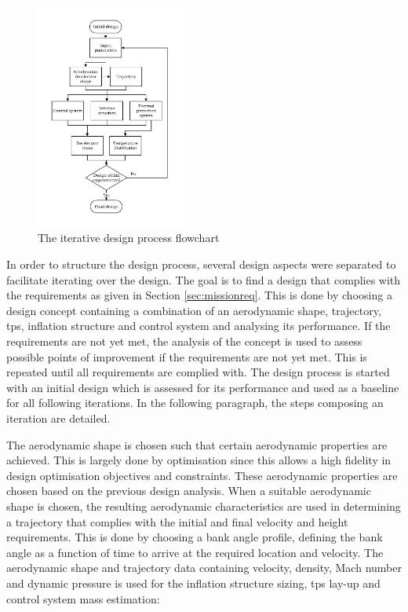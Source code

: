 \begin{figure}
	\includegraphics[width=0.44\textwidth]{./Figure/DesignIterationPhilosophy_new_cropped.pdf}
	\caption{The iterative design process flowchart}
	\label{fig:iterativedesignflowchart}		
\end{figure}


In order to structure the design process, several design aspects were separated to facilitate  iterating over the design. The goal is to find a design that complies with the requirements as given in Section \ref{sec:missionreq}. This is done by choosing a design concept containing a combination of an aerodynamic shape, trajectory, \gls{tps}, inflation structure and control system and analysing its performance. If the requirements are not yet met, the analysis of the concept is used to assess possible points of improvement if the requirements are not yet met. This is repeated until all requirements are complied with. The design process is started with an initial design which is assessed for its performance and used as a baseline for all following iterations. In the following paragraph, the steps composing an iteration are detailed.


The aerodynamic shape is chosen such that certain aerodynamic properties are achieved. This is largely done by optimisation since this allows a high fidelity in design optimisation objectives and constraints. These aerodynamic properties are chosen based on the previous design analysis. 
When a suitable aerodynamic shape is chosen, the resulting aerodynamic characteristics are used in determining a trajectory that complies with the initial and final velocity and height requirements. This is done by choosing a bank angle profile, defining the bank angle as a function of time to arrive at the required location and velocity. The aerodynamic shape and trajectory data containing velocity, density, Mach number and dynamic pressure is used for the inflation structure sizing, \gls{tps} lay-up and control system mass estimation:


